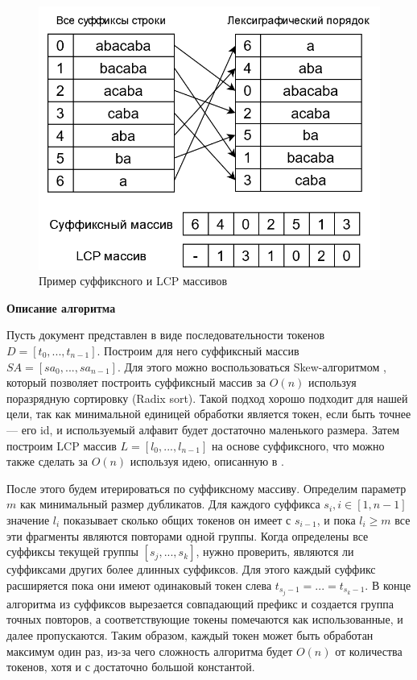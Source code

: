\documentclass[14pt]{matmex-diploma-custom}
\begin{document}
\begin{figure}[h!]
	\includegraphics[scale=0.45]{pictures/SA-LCP.png}
	\centering
	\caption{Пример суффиксного и LCP массивов}
	\label{fig:SA_LCP}
\end{figure}

\textbf{Описание алгоритма}

Пусть документ представлен в виде последовательности токенов $D = [t_0,...,t_{n-1}]$. Построим для него суффиксный массив $SA = [sa_0,...,sa_{n-1}]$. Для этого можно воспользоваться Skew-алгоритмом \cite{bib:art:SkewAlg}, который позволяет построить суффиксный массив за $O(n)$ используя поразрядную сортировку (Radix sort). Такой подход хорошо подходит для нашей цели, так как минимальной единицей обработки является токен, если быть точнее --- его id, и используемый алфавит будет достаточно маленького размера. Затем построим LCP массив $L = [l_0,...,l_{n-1}]$ на основе суффиксного, что можно также сделать за $O(n)$ используя идею, описанную в \cite{bib:art:LCPArray}.

После этого будем итерироваться по суффиксному массиву. Определим параметр $m$ как минимальный размер дубликатов. Для каждого суффикса $s_i, i \in [1,n-1]$ значение $l_i$ показывает сколько общих токенов он имеет с $s_{i-1}$, и пока $l_i \ge m$ все эти фрагменты являются повторами одной группы. Когда определены все суффиксы текущей группы $[s_j,...,s_k]$, нужно проверить, являются ли суффиксами других более длинных суффиксов. Для этого каждый суффикс расширяется пока они имеют одинаковый токен слева $t_{s_j - 1} = ... = t_{s_k - 1}$. В конце алгоритма из суффиксов вырезается совпадающий префикс и создается группа точных повторов, а соответствующие токены помечаются как использованные, и далее пропускаются. Таким образом, каждый токен может быть обработан максимум один раз, из-за чего сложность алгоритма будет $O(n)$ от количества токенов, хотя и с достаточно большой константой.
\end{document}
